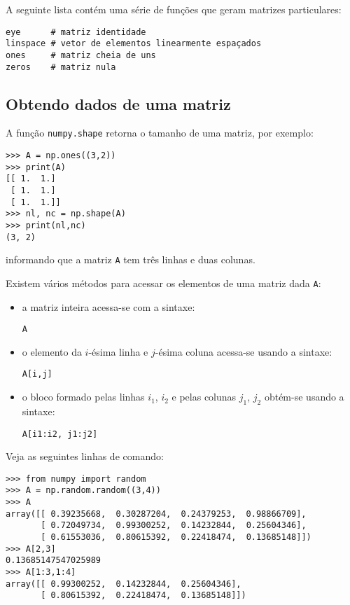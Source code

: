 A seguinte lista contém uma série de funções que geram matrizes particulares:

\begin{lstlisting}
eye      # matriz identidade
linspace # vetor de elementos linearmente espaçados
ones     # matriz cheia de uns
zeros    # matriz nula
\end{lstlisting}

\subsection{Obtendo dados de uma matriz}

A função \verb+numpy.shape+ retorna o tamanho de uma matriz, por exemplo:
\begin{lstlisting}
>>> A = np.ones((3,2))
>>> print(A)
[[ 1.  1.]
 [ 1.  1.]
 [ 1.  1.]]
>>> nl, nc = np.shape(A)
>>> print(nl,nc)
(3, 2)
\end{lstlisting}
informando que a matriz \verb+A+ tem três linhas e duas colunas.

Existem vários métodos para acessar os elementos de uma matriz dada \verb+A+:
\begin{itemize}
\item a matriz inteira acessa-se com a sintaxe:
\begin{lstlisting}
A
\end{lstlisting}
\item o elemento da $i$-ésima linha e $j$-ésima coluna acessa-se usando a sintaxe:
\begin{lstlisting}
A[i,j]
\end{lstlisting}
\item o bloco formado pelas linhas $i_1$, $i_2$ e pelas colunas $j_1$, $j_2$ obtém-se usando a sintaxe:
\begin{lstlisting}
A[i1:i2, j1:j2]
\end{lstlisting}
\end{itemize}

\begin{ex}
  Veja as seguintes linhas de comando:
\begin{lstlisting}
>>> from numpy import random
>>> A = np.random.random((3,4))
>>> A
array([[ 0.39235668,  0.30287204,  0.24379253,  0.98866709],
       [ 0.72049734,  0.99300252,  0.14232844,  0.25604346],
       [ 0.61553036,  0.80615392,  0.22418474,  0.13685148]])
>>> A[2,3]
0.13685147547025989
>>> A[1:3,1:4]
array([[ 0.99300252,  0.14232844,  0.25604346],
       [ 0.80615392,  0.22418474,  0.13685148]])
\end{lstlisting}
\end{ex}


